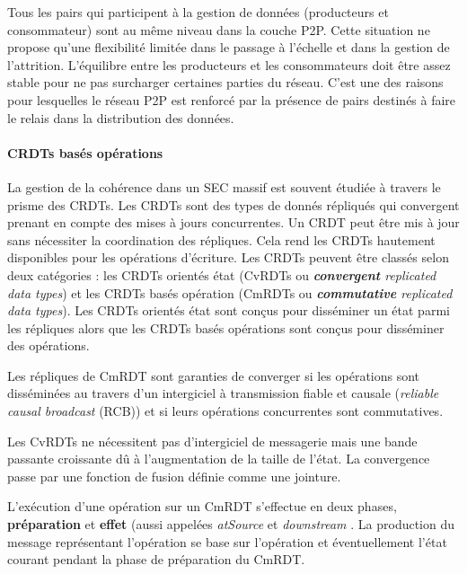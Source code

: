 Tous les pairs qui participent à la gestion de 
données (producteurs et consommateur) sont au même 
niveau dans la couche \gls{P2P}. Cette situation ne propose qu'une flexibilité 
limitée dans le passage à l'échelle et dans la gestion de l'attrition. L'équilibre entre 
les producteurs 
et les consommateurs doit être assez stable pour ne pas surcharger certaines 
parties du réseau. C'est une des raisons pour lesquelles le réseau 
\gls{P2P} est renforcé par la présence de pairs destinés à 
faire le relais dans la distribution des données. 


\paragraph{\glspl{CRDT} basés opérations}
La gestion de la cohérence dans un \gls{SEC} massif est souvent étudiée à 
travers le prisme des \glspl{CRDT}. Les \glspl{CRDT} sont des 
types de 
donnés répliqués qui convergent prenant en compte des mises à jours 
concurrentes. 
Un \gls{CRDT} peut être mis à jour sans nécessiter la coordination des répliques. 
Cela rend les \glspl{CRDT} hautement disponibles pour les opérations d'écriture. 
Les \glspl{CRDT} peuvent être classés selon deux catégories : les \glspl{CRDT} 
orientés état (CvRDTs ou \textit{\textbf{convergent} replicated data types}) et les 
\glspl{CRDT} basés opération (CmRDTs ou\textit{ \textbf{commutative} replicated 
data types}). Les \glspl{CRDT} orientés état sont conçus pour disséminer un 
état parmi les répliques alors que les \glspl{CRDT} basés opérations sont conçus 
pour disséminer des opérations.

Les répliques de CmRDT sont garanties de converger si les opérations sont 
disséminées au travers d'un intergiciel à transmission fiable et causale 
(\textit{reliable causal broadcast} (RCB)) et si leurs opérations concurrentes sont 
commutatives.

Les CvRDTs ne nécessitent pas d'intergiciel de messagerie mais une bande 
passante croissante dû à l'augmentation de la taille de l'état. La convergence 
passe par une fonction de fusion définie comme une jointure.

L'exécution d'une opération sur un CmRDT s'effectue en deux phases, 
\textbf{préparation} et \textbf{effet} (aussi appelées \textit{atSource} et 
\textit{downstream} \cite{Shapiro2011}. La production du message représentant 
l'opération se base sur l'opération et éventuellement l'état courant pendant la 
phase de préparation du CmRDT.

